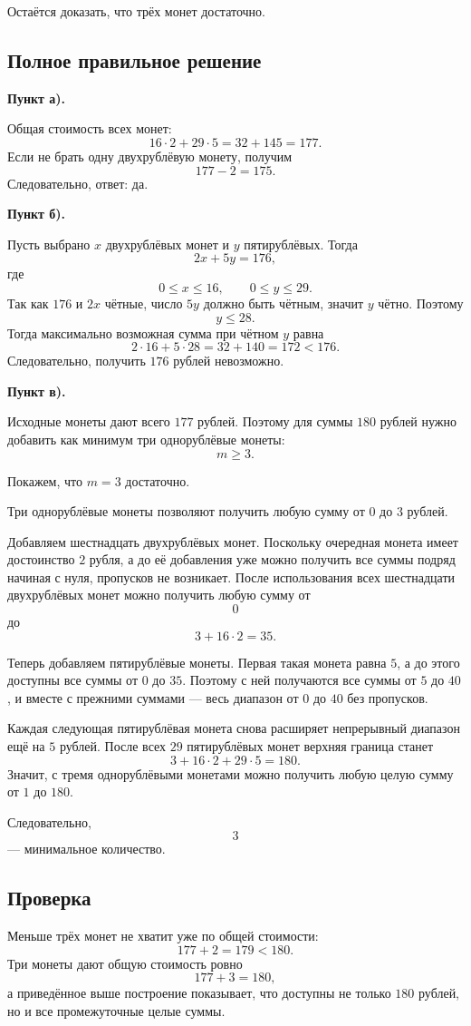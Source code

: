 \documentclass[12pt,a4paper]{article}
\begin{document}
Остаётся доказать, что трёх монет достаточно.

\subsection*{Полное правильное решение}
\textbf{Пункт а).}

Общая стоимость всех монет:
\[
16\cdot2+29\cdot5=32+145=177.
\]
Если не брать одну двухрублёвую монету, получим
\[
177-2=175.
\]
Следовательно, ответ: да.

\textbf{Пункт б).}

Пусть выбрано $x$ двухрублёвых монет и $y$ пятирублёвых. Тогда
\[
2x+5y=176,
\]
где
\[
0\le x\le16,\qquad 0\le y\le29.
\]
Так как $176$ и $2x$ чётные, число $5y$ должно быть чётным, значит $y$ чётно. Поэтому
\[
y\le28.
\]
Тогда максимально возможная сумма при чётном $y$ равна
\[
2\cdot16+5\cdot28=32+140=172<176.
\]
Следовательно, получить $176$ рублей невозможно.

\textbf{Пункт в).}

Исходные монеты дают всего $177$ рублей. Поэтому для суммы $180$ рублей нужно добавить как минимум три однорублёвые монеты:
\[
m\ge3.
\]

Покажем, что $m=3$ достаточно.

Три однорублёвые монеты позволяют получить любую сумму от $0$ до $3$ рублей.

Добавляем шестнадцать двухрублёвых монет. Поскольку очередная монета имеет достоинство $2$ рубля, а до её добавления уже можно получить все суммы подряд начиная с нуля, пропусков не возникает. После использования всех шестнадцати двухрублёвых монет можно получить любую сумму от
\[
0
\]
до
\[
3+16\cdot2=35.
\]

Теперь добавляем пятирублёвые монеты. Первая такая монета равна $5$, а до этого доступны все суммы от $0$ до $35$. Поэтому с ней получаются все суммы от $5$ до $40$, и вместе с прежними суммами --- весь диапазон от $0$ до $40$ без пропусков.

Каждая следующая пятирублёвая монета снова расширяет непрерывный диапазон ещё на $5$ рублей. После всех $29$ пятирублёвых монет верхняя граница станет
\[
3+16\cdot2+29\cdot5=180.
\]
Значит, с тремя однорублёвыми монетами можно получить любую целую сумму от $1$ до $180$.

Следовательно,
\[
\boxed{3}
\]
--- минимальное количество.

\subsection*{Проверка}
Меньше трёх монет не хватит уже по общей стоимости:
\[
177+2=179<180.
\]
Три монеты дают общую стоимость ровно
\[
177+3=180,
\]
а приведённое выше построение показывает, что доступны не только $180$ рублей, но и все промежуточные целые суммы.
\end{document}

